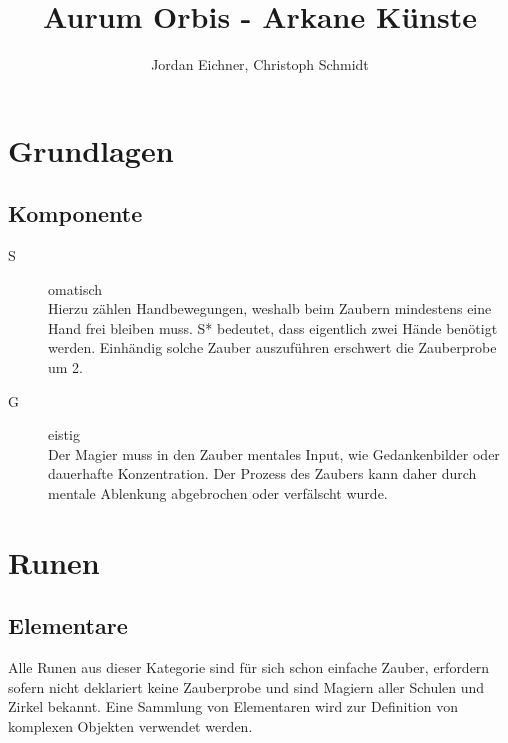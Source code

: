 \documentclass[a4paper,12pt,oneside]{book}
\title{Aurum Orbis - Arkane Künste}
\author{Jordan Eichner, Christoph Schmidt}
\date{}
\begin{document}
\maketitle
\tableofcontents

\part{Grundlagen}

\chapter{Komponente}
\begin{description}
\item[S]omatisch
\\Hierzu zählen Handbewegungen, weshalb beim Zaubern mindestens eine Hand frei bleiben muss. S* bedeutet, dass eigentlich zwei Hände benötigt werden. Einhändig solche Zauber auszuführen erschwert die Zauberprobe um 2.
\item[G]eistig
\\Der Magier muss in den Zauber mentales Input, wie Gedankenbilder oder dauerhafte Konzentration. Der Prozess des Zaubers kann daher durch mentale Ablenkung abgebrochen oder verfälscht wurde. 
\end{description}


\part{Runen}

\chapter{Elementare}
Alle Runen aus dieser Kategorie sind für sich schon einfache Zauber, erfordern sofern nicht deklariert keine Zauberprobe und sind Magiern aller Schulen und Zirkel bekannt. Eine Sammlung von Elementaren wird zur Definition von komplexen Objekten verwendet werden. 
\end{document}

